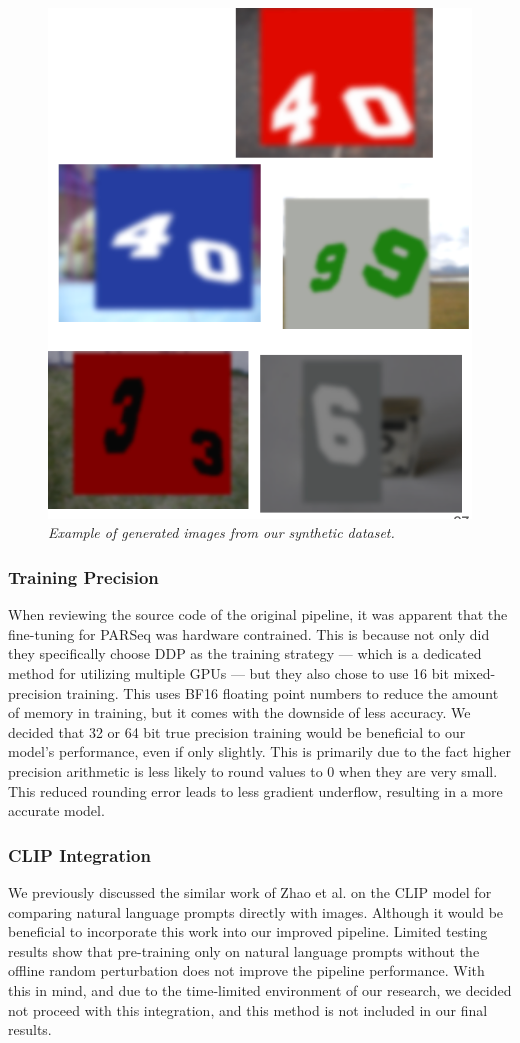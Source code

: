 \documentclass[11pt, letterpaper]{article}
\begin{document}
\begin{figure}
  \centering
  \includegraphics[width=0.5\linewidth]{img/synthetic_example.png}
  \caption{\label{fig:synthetic_example}\textit{Example of generated images from our synthetic dataset.}}
\end{figure}

\subsubsection{Training Precision}

When reviewing the source code of the original pipeline, it was apparent that the fine-tuning for PARSeq was hardware contrained. This is because not only did they specifically choose DDP as the training strategy — which is a dedicated method for utilizing multiple GPUs — but they also chose to use 16 bit mixed-precision training. This uses BF16 floating point numbers to reduce the amount of memory in training, but it comes with the downside of less accuracy. We decided that 32 or 64 bit true precision training would be beneficial to our model's performance, even if only slightly. This is primarily due to the fact higher precision arithmetic is less likely to round values to 0 when they are very small. This reduced rounding error leads to less gradient underflow, resulting in a more accurate model.

\subsubsection{CLIP Integration}

We previously discussed the similar work of Zhao et al. on the CLIP model for comparing natural language prompts directly with images. Although it would be beneficial to incorporate this work into our improved pipeline. Limited testing results show that pre-training only on natural language prompts without the offline random perturbation does not improve the pipeline performance. With this in mind, and due to the time-limited environment of our research, we decided not proceed with this integration, and this method is not included in our final results.
\end{document}

